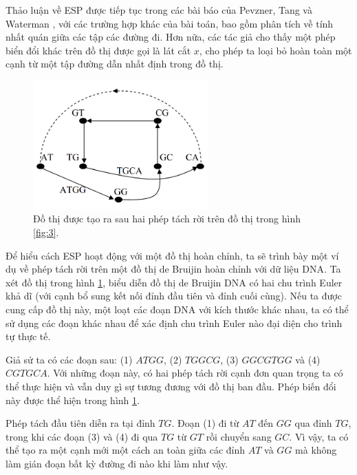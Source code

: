 \documentclass[14pt, a4paper]{article}
\numberwithin{equation}{section}
\numberwithin{figure}{section}
\numberwithin{dl}{section}
\numberwithin{md}{section}
\numberwithin{bd}{section}
\numberwithin{dn}{section}
\numberwithin{hq}{section}
\begin{document}
    Thảo luận về ESP được tiếp tục trong các bài báo của Pevzner, Tang và Waterman \cite{pevzner2001eulerian}, \cite{pevzner2001new} với các trường hợp khác của bài toán, bao gồm phân tích về tính nhất quán giữa các tập các đường đi.
    Hơn nữa, các tác giả cho thấy một phép biển đổi khác trên đồ thị được gọi là lát cắt $x$, cho phép ta loại bỏ hoàn toàn một cạnh từ một tập đường dẫn nhất định trong đồ thị.

    \begin{figure}[h!]
        \centering
        \includegraphics[width=0.6\textwidth]{8.png}
        \caption{Đồ thị được tạo ra sau hai phép tách rời trên đồ thị trong hình \ref{fig:3}.}
        \label{fig:8}
    \end{figure}


    Để hiểu cách ESP hoạt động với một đồ thị hoàn chỉnh, ta sẽ trình bày một ví dụ về phép tách rời trên một đồ thị de Bruijin hoàn chỉnh với dữ liệu DNA.
    Ta xét đồ thị trong hình \ref{fig:8}, biểu diễn đồ thị de Bruijin DNA có hai chu trình Euler khả dĩ (với cạnh bổ sung kết nối đỉnh đầu tiên và đỉnh cuối cùng).
    Nếu ta được cung cấp đồ thị này, một loạt các đoạn DNA với kích thước khác nhau, ta có thể sử dụng các đoạn khác nhau để xác định chu trình Euler nào đại diện cho trình tự thực tế.

    Giả sử ta có các đoạn sau: (1) $ATGG$, (2) $TGGCG$, (3) $GGCGTGG$ và (4) $CGTGCA$.
    Với những đoạn này, có hai phép tách rời cạnh đơn quan trọng ta có thể thực hiện và vẫn duy gì sự tương đương với đồ thị ban đầu.
    Phép biến đổi này được thể hiện trong hình \ref{fig:8}.

    Phép tách đầu tiên diễn ra tại đỉnh $TG$. Đoạn (1) đi từ $AT$ đến $GG$ qua đỉnh $TG$, trong khi các đoạn (3) và (4) đi qua $TG$ từ $GT$ rồi chuyển sang $GC$.
    Vì vậy, ta có thể tạo ra một cạnh mới một cách an toàn giữa các đỉnh $AT$ và $GG$ mà không làm gián đoạn bất kỳ đường đi nào khi làm như vậy.
\end{document}
